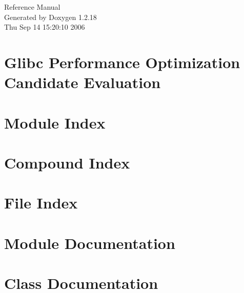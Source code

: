 \documentclass[a4paper]{book}
\begin{document}
\begin{titlepage}
\vspace*{7cm}
\begin{center}
{\Large Reference Manual}\\
\vspace*{1cm}
{\large Generated by Doxygen 1.2.18}\\
\vspace*{0.5cm}
{\small Thu Sep 14 15:20:10 2006}\\
\end{center}
\end{titlepage}
\clearemptydoublepage
{}
\tableofcontents
\clearemptydoublepage
{}
\chapter{Glibc Performance Optimization Candidate Evaluation}
\label{index}
\chapter{Module Index}

\chapter{Compound Index}

\chapter{File Index}

\chapter{Module Documentation}























\chapter{Class Documentation}























\end{document}
